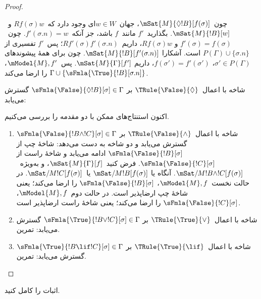 \documentclass[../../../include/open-logic-section]{subfiles}
\begin{document}
\begin{proof}
\begin{enumerate}
{{  چون~$\mSat{M}{\Diamond !B}[f(\sigma)]$، جهان~$w \in W$ای وجود دارد
  که~$Rf(\sigma)w$ و~$\mSat{M}{!B}[w]$. بگذارید~$f'$ مانند~$f$ باشد،
  جز آنکه~$f'(\sigma.n) = w$. چون~$f'(\sigma) = f(\sigma)$ و
  $Rf(\sigma)w$، داریم~$Rf'(\sigma)f'(\sigma.n)$؛ پس~$f'$ تفسیری از
  $P(\Gamma) \cup \{\sigma.n\}$ است. آشکارا
  $\mSat{M}{!B}[f'(\sigma.n)]$. چون برای همهٔ پیشوندهای
  $\sigma' \in P(\Gamma)$، $f(\sigma') = f'(\sigma')$، داریم
  $\mSat{M}{\Gamma}[f']$. پس~$\mModel{M}, f'$،
  $\Gamma \cup \{\sFmla{\True}{!B}[\sigma.n]\}$ را ارضا می‌کند.}
\item شاخه با اعمال~$\TRule{\False}{\Diamond}$ بر
  $\sFmla{\False}{\Diamond !B}[\sigma] \in \Gamma$ گسترش می‌یابد:
  }{}
\end{enumerate}
اکنون استنتاج‌های ممکن با دو مقدمه را بررسی می‌کنیم.
\begin{enumerate}
\item شاخه با اعمال~$\TRule{\False}{\land}$ بر
  $\sFmla{\False}{!B \land !C}[\sigma] \in \Gamma$ گسترش می‌یابد و
  دو شاخه به دست می‌دهد: شاخهٔ چپ از
  $\sFmla{\False}{!B}[\sigma]$ ادامه می‌یابد و شاخهٔ راست از
  $\sFmla{\False}{!C}[\sigma]$. فرض کنید~$\mSat{M}{\Gamma}[f]$، و
  به‌ویژه~$\mSat/{M}{!B \land !C}[f(\sigma)]$. آنگاه یا
  $\mSat/{M}{!B}[f(\sigma)]$ یا~$\mSat/{M}{!C}[f(\sigma)]$. در حالت
  نخست~$\mModel{M}, f$، $\sFmla{\False}{!B}[\sigma]$ را ارضا می‌کند؛
  یعنی شاخهٔ چپ ارضاپذیر است. در حالت دوم~$\mModel{M}, f$،
  $\sFmla{\False}{!C}[\sigma]$ را ارضا می‌کند؛ یعنی شاخهٔ راست
  ارضاپذیر است.
\item شاخه با اعمال~$\TRule{\True}{\lor}$ بر
    $\sFmla{\True}{!B \lor !C}[\sigma] \in \Gamma$ گسترش می‌یابد: تمرین.
\item شاخه با اعمال~$\TRule{\True}{\lif}$ بر
    $\sFmla{\True}{!B \lif !C}[\sigma] \in \Gamma$ گسترش می‌یابد: تمرین.
\end{enumerate}
\end{proof}

\begin{prob}
اثبات  را کامل کنید.
\end{prob}
\end{document}
